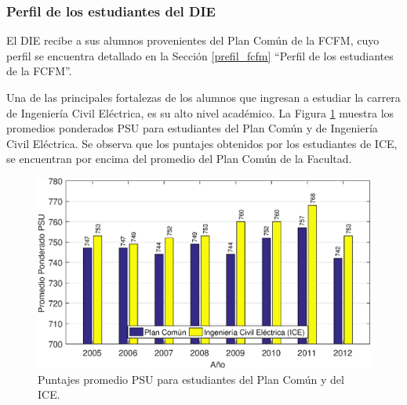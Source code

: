 \subsubsection{Perfil de los estudiantes del DIE}

El DIE recibe a sus alumnos provenientes del Plan Común de la FCFM, cuyo perfil se
encuentra detallado en la Sección \ref{prefil_fcfm} ``Perfil de los estudiantes de la FCFM''.

Una de las principales fortalezas de los alumnos que ingresan a estudiar la carrera de Ingeniería
Civil Eléctrica, es su alto nivel académico. La Figura \ref{puntajes_psu_ice} muestra los promedios ponderados PSU
para estudiantes del Plan Común y de Ingeniería Civil Eléctrica. Se observa que los puntajes
obtenidos por los estudiantes de ICE, se encuentran por encima del promedio del Plan Común de
la Facultad.

\begin{figure}[ht]
\centering
\includegraphics[width=\columnwidth]{./pictures/puntajes_psu_ice.eps}
\caption{Puntajes promedio PSU para estudiantes del Plan Común y del ICE.}
\label{puntajes_psu_ice}
\end{figure}


